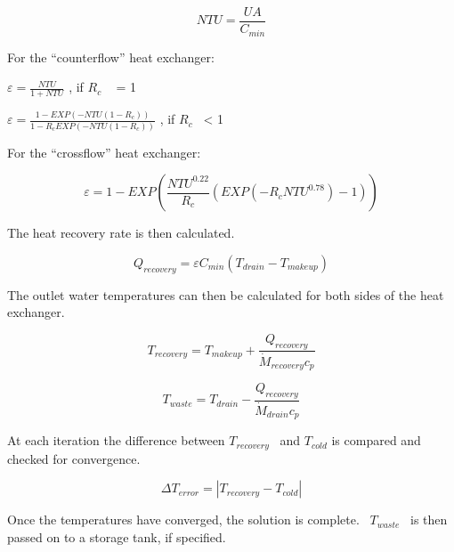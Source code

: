 \begin{equation}
NTU = \frac{{UA}}{{{C_{min}}}}
\end{equation}

For the ``counterflow'' heat exchanger:

\(\varepsilon = \frac{{NTU}}{{1 + NTU}}\) , if \({R_c}\) ~ = 1

\(\varepsilon = \frac{{1 - EXP\left( { - NTU\left( {1 - {R_c}} \right)} \right)}}{{1 - {R_c}EXP\left( { - NTU\left( {1 - {R_c}} \right)} \right)}}\) , if \({R_c}\) ~\textless{} 1

For the ``crossflow'' heat exchanger:

\begin{equation}
\varepsilon  = 1 - EXP\left( {\frac{{NT{U^{0.22}}}}{{{R_c}}}\left( {EXP\left( { - {R_c}NT{U^{0.78}}} \right) - 1} \right)} \right)
\end{equation}

The heat recovery rate is then calculated.

\begin{equation}
{Q_{recovery}} = \varepsilon {C_{min}}\left( {{T_{drain}} - {T_{makeup}}} \right)
\end{equation}

The outlet water temperatures can then be calculated for both sides of the heat exchanger.

\begin{equation}
{T_{recovery}} = {T_{makeup}} + \frac{{{Q_{recovery}}}}{{{{\dot M}_{recovery}}{c_p}}}
\end{equation}

\begin{equation}
{T_{waste}} = {T_{drain}} - \frac{{{Q_{recovery}}}}{{{{\dot M}_{drain}}{c_p}}}
\end{equation}

At each iteration the difference between \({T_{recovery}}\) ~and \({T_{cold}}\) is compared and checked for convergence.

\begin{equation}
\Delta {T_{error}} = \left| {{T_{recovery}} - {T_{cold}}} \right|
\end{equation}

Once the temperatures have converged, the solution is complete.~ \({T_{waste}}\) ~is then passed on to a storage tank, if specified.
